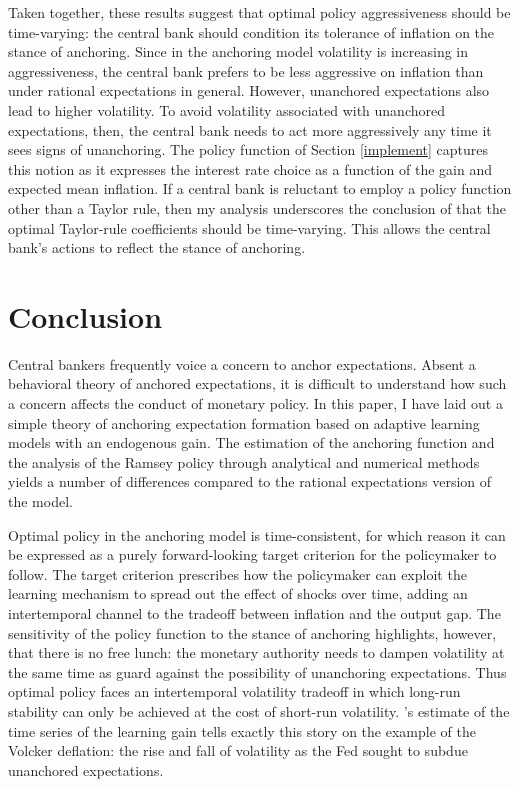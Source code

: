 \documentclass[11pt]{article}
\renewcommand{\[}{\begin{equation}}
\renewcommand{\]}{\end{equation}}
\begin{document}
Taken together, these results suggest that optimal policy aggressiveness should be time-varying: the central bank should condition its tolerance of inflation on the stance of anchoring. Since in the anchoring model volatility is increasing in aggressiveness, the central bank prefers to be less aggressive on inflation than under rational expectations in general. However, unanchored expectations also lead to higher volatility. To avoid volatility associated with unanchored expectations, then, the central bank needs to act more aggressively any time it sees signs of  unanchoring. The policy function of Section \ref{implement} captures this notion as it expresses the interest rate choice as a function of the gain and expected mean inflation. If a central bank is reluctant to employ a policy function other than a Taylor rule, then my analysis underscores the conclusion of \cite{LUBIK201685} that the optimal Taylor-rule coefficients should be time-varying. This allows the central bank's actions to reflect the stance of anchoring. 



\section{Conclusion}\label{conclusion}
Central bankers frequently voice a concern to anchor expectations. Absent a behavioral theory of anchored expectations, it is difficult to understand how such a concern affects the conduct of monetary policy. In this paper, I have laid out a simple theory of anchoring expectation formation based on adaptive learning models with an endogenous gain. The estimation of the anchoring function and the analysis of the Ramsey policy through analytical and numerical methods yields a number of differences compared to the rational expectations version of the model. 

Optimal policy in the anchoring model is time-consistent, for which reason it can be expressed as a purely forward-looking target criterion for the policymaker to follow. The target criterion prescribes how the policymaker can exploit the learning mechanism to spread out the effect of shocks over time, adding an intertemporal channel to the tradeoff between inflation and the output gap. The sensitivity of the policy function to the stance of anchoring highlights, however, that there is no free lunch: the monetary authority needs to dampen volatility at the same time as guard against the possibility of unanchoring expectations. Thus optimal policy faces an intertemporal volatility tradeoff in which long-run stability can only be achieved at the cost of short-run volatility. \cite{carvalho2019anchored}'s estimate of the time series of the learning gain tells exactly this story on the example of the Volcker deflation: the rise and fall of volatility as the Fed sought to subdue unanchored expectations. 
\end{document}
